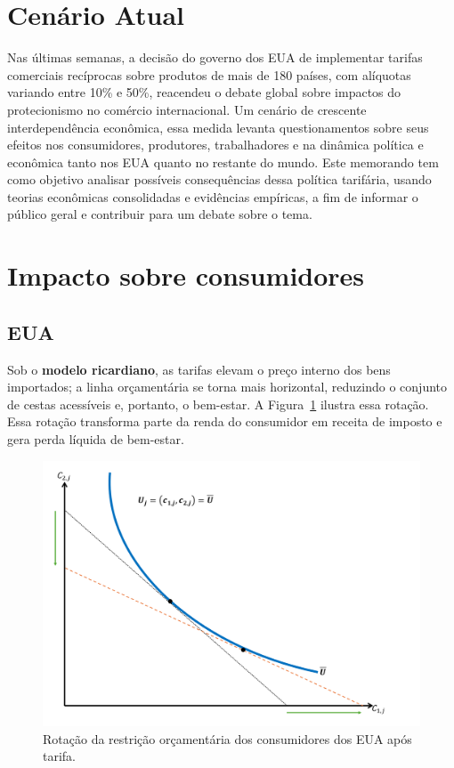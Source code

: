 \documentclass[a4paper,12pt]{article}[abntex2]
\begin{document}
\section*{\textbf{Cenário Atual}}

Nas últimas semanas, a decisão do governo dos EUA de implementar tarifas comerciais recíprocas sobre produtos de mais de 180 países, com alíquotas variando entre 10\% e 50\%, reacendeu o debate global sobre impactos do protecionismo no comércio internacional. Um cenário de crescente interdependência econômica, essa medida levanta questionamentos sobre seus efeitos nos consumidores, produtores, trabalhadores e na dinâmica política e econômica tanto nos EUA quanto no restante do mundo. Este memorando tem como objetivo analisar possíveis consequências dessa política tarifária, usando teorias econômicas consolidadas e evidências empíricas, a fim de informar o público geral e contribuir para um debate sobre o tema.

\section*{\textbf{Impacto sobre consumidores}}

\subsection*{\textbf{EUA}}

Sob o \textbf{modelo ricardiano}, as tarifas elevam o preço interno dos bens importados; a linha orçamentária se torna mais horizontal, reduzindo o conjunto de cestas acessíveis e, portanto, o bem-estar. A Figura~\ref{fig:budget} ilustra essa rotação. Essa rotação transforma parte da renda do consumidor em receita de imposto e gera perda líquida de bem-estar. 

\begin{figure}[H]
  \centering
  \includegraphics[width=0.7\linewidth]{Imagens/aps1i1.png}
  \caption{Rotação da restrição orçamentária dos consumidores dos EUA após tarifa.}
  \label{fig:budget}
\end{figure}
\end{document}
